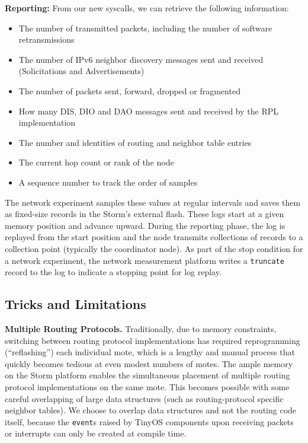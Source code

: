 \textbf{Reporting:}
From our new syscalls, we can retrieve the following information:
\begin{itemize}
\item The number of transmitted packets, including the number of software retransmissions
\item The number of IPv6 neighbor discovery messages sent and received (Solicitations and Advertisements)
\item The number of packets sent, forward, dropped or fragmented
\item How many DIS, DIO and DAO messages sent and received by the RPL implementation
\item The number and identities of routing and neighbor table entries
\item The current hop count or rank of the node
\item A sequence number to track the order of samples
\end{itemize}

The network experiment samples these values at regular intervals and saves them as fixed-size records in the Storm's external flash.
These logs start at a given memory position and advance upward.
During the reporting phase, the log is replayed from the start position and the node transmits collections of records to a collection point (typically the coordinator node).
As part of the stop condition for a network experiment, the network measurement platform writes a \texttt{truncate} record to the log to indicate a stopping point for log replay.

\subsection{Tricks and Limitations}

\textbf{Multiple Routing Protocols.} Traditionally, due to memory constraints, switching between routing protocol implementations has required reprogramming (``reflashing'') each individual mote, which is a lengthy and manual process that quickly becomes tedious at even modest numbers of motes.
The ample memory on the Storm platform enables the simultaneous placement of multiple routing protocol implementations on the same mote.
This becomes possible with some careful overlapping of large data structures (such as routing-protocol specific neighbor tables).
We choose to overlap data structures and not the routing code itself, because the \texttt{event}s raised by TinyOS components upon receiving packets or interrupts can only be created at compile time.


